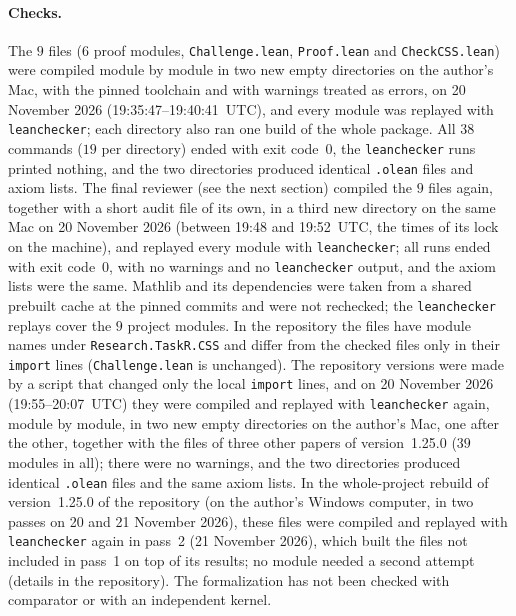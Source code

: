 \documentclass[11pt]{article}
\theoremstyle{definition}
\theoremstyle{remark}
\newcommand{\repoversion}{1.25.0}
\begin{document}
{\paragraph{Checks.}
The $9$ files ($6$ proof modules, \texttt{Challenge.lean},
\texttt{Proof.lean} and \texttt{CheckCSS.lean}) were compiled module by
module in two new empty directories on the author's Mac, with the pinned
toolchain and with warnings treated as errors, on 20 November 2026
(19:35:47--19:40:41~UTC), and every module was replayed with
\texttt{leanchecker}; each directory also ran one build of the whole package.
All $38$ commands ($19$ per directory) ended with exit code~$0$, the
\texttt{leanchecker} runs printed nothing, and the two directories produced
identical \texttt{.olean} files and axiom lists. The final reviewer (see the
next section) compiled the $9$ files again, together with a short audit file
of its own, in a third new directory on the same Mac on 20 November 2026
(between 19:48 and 19:52~UTC, the times of its lock on the machine), and
replayed every module with \texttt{leanchecker}; all runs ended with exit
code~$0$, with no warnings and no \texttt{leanchecker} output, and the axiom
lists were the same. Mathlib and its dependencies were taken from a shared
prebuilt cache at the pinned commits and were not rechecked; the
\texttt{leanchecker} replays cover the $9$ project modules. In the repository
the files have module names under \texttt{Research.TaskR.CSS} and differ from
the checked files only in their \texttt{import} lines
(\texttt{Challenge.lean} is unchanged). The repository versions were made by a script that changed only the local \texttt{import} lines, and on 20 November 2026 (19:55--20:07~UTC) they were compiled and replayed with \texttt{leanchecker} again, module by module, in two new empty directories on the author's Mac, one after the other, together with the files of three other papers of version~\repoversion{} ($39$ modules in all); there were no warnings, and the two directories produced identical \texttt{.olean} files and the same axiom lists. In the whole-project rebuild of version~\repoversion{} of the repository (on the author's Windows computer, in two passes on 20 and 21 November 2026), these files were compiled and replayed with \texttt{leanchecker} again in pass~2 (21 November 2026), which built the files not included in pass~1 on top of its results; no module needed a second attempt (details in the repository). The
formalization has not been checked with comparator or with an independent
kernel.

\par}
\end{document}
